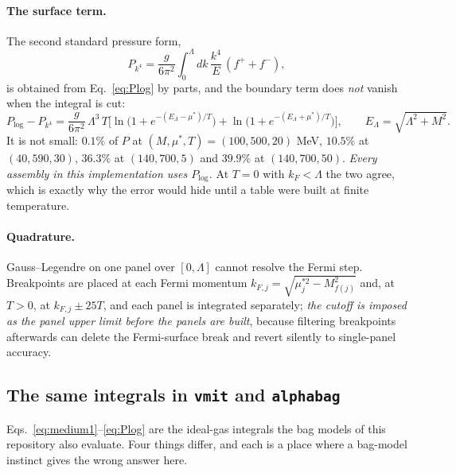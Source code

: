 \documentclass[aps,prc,onecolumn,superscriptaddress,nofootinbib,10pt]{revtex4-2}
\newcommand{\Lam}{\Lambda}
\begin{document}
\paragraph{The surface term.} The second standard pressure form,
\begin{equation}
  P_{k^4} = \frac{g}{6\pi^2}\int_0^{\Lam}\!\! dk\,
            \frac{k^4}{E}\,(f^{+}+f^{-}) ,
\end{equation}
is obtained from Eq.~\eqref{eq:Plog} by parts, and the boundary term does
\emph{not} vanish when the integral is cut:
\begin{equation}
  P_{\log} - P_{k^4} = \frac{g}{6\pi^2}\,\Lam^3\, T
    \Big[ \ln\!\big(1+e^{-(E_\Lam-\mu^{*})/T}\big)
        + \ln\!\big(1+e^{-(E_\Lam+\mu^{*})/T}\big) \Big] ,
  \qquad E_\Lam = \sqrt{\Lam^2+M^2} .
  \label{eq:surface}
\end{equation}
It is not small: $0.1\%$ of $P$ at $(M,\mu^{*},T) = (100,500,20)$ MeV,
$10.5\%$ at $(40,590,30)$, $36.3\%$ at $(140,700,5)$ and $39.9\%$ at
$(140,700,50)$. \emph{Every assembly in this implementation uses
$P_{\log}$.} At $T=0$ with $k_F < \Lam$ the two agree, which is exactly why
the error would hide until a table were built at finite temperature.

\paragraph{Quadrature.} Gauss--Legendre on one panel over $[0,\Lam]$ cannot
resolve the Fermi step. Breakpoints are placed at each Fermi momentum
$k_{F,j} = \sqrt{\mu^{*2}_j - M_{f(j)}^2}$ and, at $T>0$, at
$k_{F,j} \pm 25T$, and each panel is integrated separately; \emph{the cutoff is
imposed as the panel upper limit before the panels are built}, because
filtering breakpoints afterwards can delete the Fermi-surface break and revert
silently to single-panel accuracy.

\subsection{The same integrals in \texttt{vmit} and \texttt{alphabag}}
\label{sec:bagcompare}

Eqs.~\eqref{eq:medium1}--\eqref{eq:Plog} are the ideal-gas integrals the bag
models of this repository also evaluate. Four things differ, and each is a
place where a bag-model instinct gives the wrong answer here.
\end{document}
